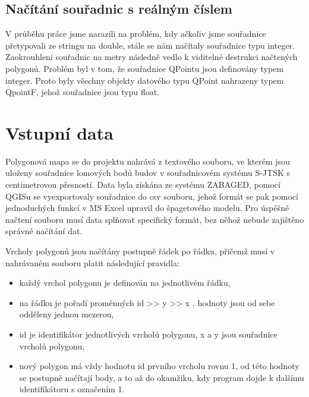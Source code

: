 \documentclass[11pt]{article}
\begin{document}
	
	\subsection{Načítání souřadnic s reálným číslem}
	V průběhu práce jsme narazili na problém, kdy ačkoliv jsme souřadnice přetypovali ze stringu na double, stále se nám načítaly souřadnice typu integer. Zaokrouhlení souřadnic na metry následně vedlo k viditelné destrukci načtených polygonů. Problém byl v tom, že souřadnice QPointu jsou definovány typem integer. Proto byly všechny objekty datového typu QPoint nahrazeny typem QpointF, jehož souřadnice jsou typu float.
	
	
	\clearpage
	
	
	
	\section{Vstupní data}
	Polygonová mapa se do projektu nahrává z textového souboru, ve kterém jsou uloženy souřadnice lomových bodů budov v souřadnicovém systému S-JTSK s centimetrovou přesností. Data byla získána ze systému ZABAGED, pomocí QGISu se vyexportovaly souřadnice do csv souboru, jehož formát se pak pomocí jednoduchých funkcí v MS Excel upravil do špagetového modelu. Pro úspěšné načtení souboru musí data splňovat specifický formát, bez něhož nebude zajištěno správné načítání dat.  
	
	Vrcholy polygonů jsou načítány postupně řádek po řádku, přičemž musí v nahrávaném souboru platit následující pravidla:    
	
	\begin{itemize}
		\item každý vrchol polygonu je definován na jednotlivém řádku,
		\item na řádku je pořadí proměnných id >> y >> x   ,  hodnoty jsou od sebe odděleny  jednou mezerou,
		\item id je identifikátor jednotlivých vrcholů polygonu, x a y jsou souřadnice vrcholů polygonu,    
		\item nový polygon má vždy hodnotu id prvního vrcholu rovnu 1, od této hodnoty  se  postupně načítají body, a  to až do okamžiku,  kdy program dojde  k dalšímu identifikátoru s označením 1.   
	\end{itemize}
	
\end{document}
